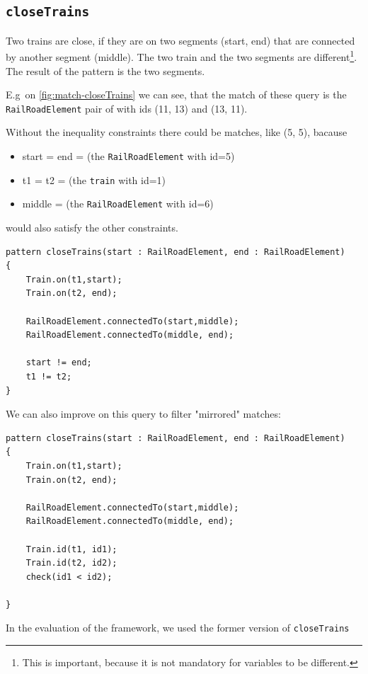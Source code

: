 \vspace{\belowdisplayskip}







\subsection{\texttt{closeTrains}}

Two trains are close, if they are on two segments (start, end) that are connected by another segment (middle). The two train and the two segments are different\footnote{This is important, because it is not mandatory for variables to be different.}.
The result of the pattern is the two segments.

E.g\ on \autoref{fig:match-closeTrains} we can see, that the match of these query is the \texttt{RailRoadElement} pair of with ids (11, 13) and (13, 11). 

Without the inequality constraints there could be matches, like (5, 5), bacause
\begin{itemize}
	\item start = end = (the \texttt{RailRoadElement} with id=5)
	\item t1 = t2 = (the \texttt{train} with id=1)
	\item middle = (the \texttt{RailRoadElement} with id=6)

\end{itemize}
would also satisfy the other constraints.

\begin{minipage}{\textwidth}
\begin{lstlisting}[language = vql]
pattern closeTrains(start : RailRoadElement, end : RailRoadElement)
{
	Train.on(t1,start);
	Train.on(t2, end);
	
	RailRoadElement.connectedTo(start,middle); 
	RailRoadElement.connectedTo(middle, end);
		
	start != end; 
	t1 != t2;	
}
\end{lstlisting}
\end{minipage}

\begin{minipage}{\textwidth}
We can also improve on this query to filter "mirrored" matches:
\begin{lstlisting}[language = vql]
pattern closeTrains(start : RailRoadElement, end : RailRoadElement)
{
	Train.on(t1,start);
	Train.on(t2, end);
	
	RailRoadElement.connectedTo(start,middle); 
	RailRoadElement.connectedTo(middle, end);

	Train.id(t1, id1);
	Train.id(t2, id2);
	check(id1 < id2);
	
}
\end{lstlisting}
In the evaluation of the framework, we used the former version of \texttt{closeTrains}
\end{minipage}

